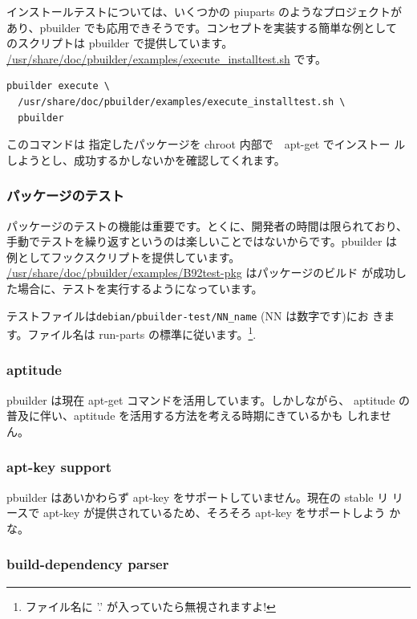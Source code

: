 \documentclass[mingoth,a4paper]{jsarticle}
\begin{document}
インストールテストについては、いくつかの piuparts のようなプロジェクトが
あり、pbuilder でも応用できそうです。コンセプトを実装する簡単な例として
のスクリプトは pbuilder で提供しています。
\url{/usr/share/doc/pbuilder/examples/execute_installtest.sh} です。

\begin{verbatim}
pbuilder execute \
  /usr/share/doc/pbuilder/examples/execute_installtest.sh \
  pbuilder
\end{verbatim}

このコマンドは 指定したパッケージを chroot 内部で　apt-get でインストー
ルしようとし、成功するかしないかを確認してくれます。

\subsubsection{パッケージのテスト}

パッケージのテストの機能は重要です。とくに、開発者の時間は限られており、
手動でテストを繰り返すというのは楽しいことではないからです。pbuilder は
例としてフックスクリプトを提供しています。
\url{/usr/share/doc/pbuilder/examples/B92test-pkg} はパッケージのビルド
が成功した場合に、テストを実行するようになっています。

テストファイルは\verb!debian/pbuilder-test/NN_name! (NN は数字です)にお
きます。ファイル名は run-parts の標準に従います。\footnote{ファイル名に 
'.' が入っていたら無視されますよ!}.

\subsubsection{aptitude}

pbuilder は現在 apt-get コマンドを活用しています。しかしながら、 
aptitude の普及に伴い、aptitude を活用する方法を考える時期にきているかも
しれません。

\subsubsection{apt-key support}

pbuilder はあいかわらず apt-key をサポートしていません。現在の stable リ
リースで apt-key が提供されているため、そろそろ apt-key をサポートしよう
かな。

\subsubsection{build-dependency parser}
\end{document}
